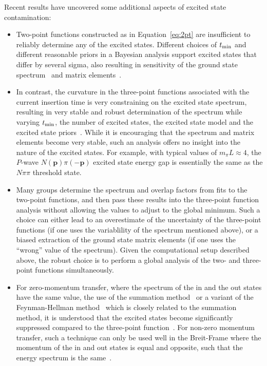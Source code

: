 \documentclass{ar-1col}
\def\tmin{t_{\rm min}}
\begin{document}
Recent results have uncovered some additional aspects of excited state contamination:
\begin{itemize}[leftmargin=*]
\item Two-point functions constructed as in Equation~\eqref{eq:2pt} are insufficient to reliably determine any of the excited states.  Different choices of $\tmin$ and different reasonable priors in a Bayesian analysis support excited states that differ by several sigma, also resulting in sensitivity of the ground state spectrum~\cite{Park:2021ypf,He:2021yvm} and matrix elements~\cite{Jang:2019vkm,Gupta:2021ahb}.

\item In contrast, the curvature in the three-point functions associated with the current insertion time is very constraining on the excited state spectrum, resulting in very stable and robust determination of the spectrum while varying $\tmin$, the number of excited states, the excited state model and the excited state priors~\cite{He:2021yvm}.
While it is encouraging that the spectrum and matrix elements become very stable, such an analysis offers no insight into the nature of the excited states.  For example, with typical values of $m_\pi L\approx4$, the $P$-wave $N(\mathbf{p})\pi(-\mathbf{p})$ excited state energy gap is essentially the same as the $N\pi\pi$ threshold state.%
\begin{marginnote}
\end{marginnote}

\item Many groups determine the spectrum and overlap factors from fits to the two-point functions, and then pass these results into the three-point function analysis without allowing the values to adjust to the global minimum.  Such a choice can either lead to an overestimate of the uncertainty of the three-point functions (if one uses the variablility of the spectrum mentioned above), or a biased extraction of the ground state matrix elements (if one uses the ``wrong'' value of the spectrum).  Given the computational setup described above, the robust choice is to perform a global analysis of the two- and three-point functions simultaneously.

\item For zero-momentum transfer, where the spectrum of the in and the out states have the same value,
the use of the summation method~\cite{Maiani:1987by} or a variant of the Feynman-Hellman method~\cite{deDivitiis:2012vs,Bouchard:2016heu} which is closely related to the summation method, it is understood that the excited states become significantly suppressed compared to the three-point function~\cite{Capitani:2012gj,He:2021yvm}.
For non-zero momentum transfer, such a technique can only be used well in the Breit-Frame where the momentum of the in and out states is equal and opposite, such that the energy spectrum is the same~\cite{Gambhir:2019pvw}.


\end{itemize}
\end{document}

